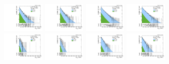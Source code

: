 \begin{figure}[htbp]
  \includegraphics[width=0.18\textwidth]{fig/fitValidation/PostFit_SR_MVV_MJJ020to070__mu_HP_nobb_HDy_Run2.pdf}
  \includegraphics[width=0.18\textwidth]{fig/fitValidation/PostFit_SR_MVV_MJJ020to070__e_HP_nobb_HDy_Run2.pdf}
  \includegraphics[width=0.18\textwidth]{fig/fitValidation/PostFit_SR_MVV_MJJ020to070__mu_LP_nobb_HDy_Run2.pdf}
  \includegraphics[width=0.18\textwidth]{fig/fitValidation/PostFit_SR_MVV_MJJ020to070__e_LP_nobb_HDy_Run2.pdf}\\
  \includegraphics[width=0.18\textwidth]{fig/fitValidation/PostFit_SR_MVV_MJJ020to070__mu_HP_vbf_HDy_Run2.pdf}
  \includegraphics[width=0.18\textwidth]{fig/fitValidation/PostFit_SR_MVV_MJJ020to070__e_HP_vbf_HDy_Run2.pdf}
  \includegraphics[width=0.18\textwidth]{fig/fitValidation/PostFit_SR_MVV_MJJ020to070__mu_LP_vbf_HDy_Run2.pdf}
  \includegraphics[width=0.18\textwidth]{fig/fitValidation/PostFit_SR_MVV_MJJ020to070__e_LP_vbf_HDy_Run2.pdf}\\
  \caption{
  }
  \label{fig:postfit_MVV_MJJ020to070_Run2}
\end{figure}


